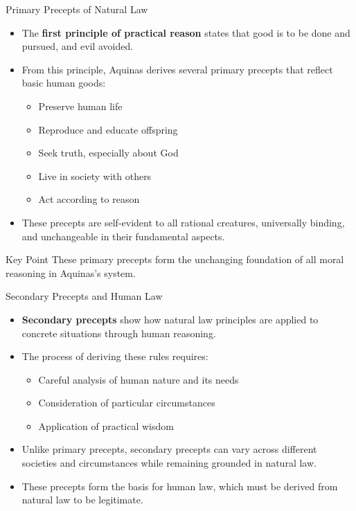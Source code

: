 \documentclass{beamer}
\begin{document}
\begin{frame}{Primary Precepts of Natural Law}
    \begin{itemize}
        \item The \textbf{first principle of practical reason} states that good is to be done and pursued, and evil avoided.
        
        \item From this principle, Aquinas derives several primary precepts that reflect basic human goods:
        \begin{itemize}
            \item Preserve human life
            \item Reproduce and educate offspring
            \item Seek truth, especially about God
            \item Live in society with others
            \item Act according to reason
        \end{itemize}
        
        \item These precepts are self-evident to all rational creatures, universally binding, and unchangeable in their fundamental aspects.
    \end{itemize}
    
    \begin{alertblock}{Key Point}
        These primary precepts form the unchanging foundation of all moral reasoning in Aquinas's system.
    \end{alertblock}
\end{frame}

\begin{frame}{Secondary Precepts and Human Law}
    \begin{itemize}
        \item \textbf{Secondary precepts} show how natural law principles are applied to concrete situations through human reasoning.
        
        \item The process of deriving these rules requires:
        \begin{itemize}
            \item Careful analysis of human nature and its needs
            \item Consideration of particular circumstances
            \item Application of practical wisdom
        \end{itemize}
        
        \item Unlike primary precepts, secondary precepts can vary across different societies and circumstances while remaining grounded in natural law.
        
        \item These precepts form the basis for human law, which must be derived from natural law to be legitimate.
    \end{itemize}
\end{frame}
\end{document}
